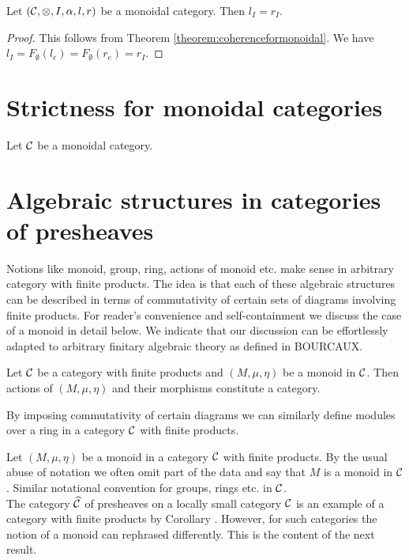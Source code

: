 \begin{corollary}\label{corollary:unitsareequalonunit}
Let $({\mathcal C},\otimes, I,\alpha, l, r)$ be a monoidal category. Then $l_I = r_I$.
\end{corollary}
\begin{proof}
This follows from Theorem \ref{theorem:coherenceformonoidal}. We have $l_I=F_\emptyset(l_e) = F_\emptyset(r_e)=r_I$.  
\end{proof}

\section{Strictness for monoidal categories}
\noindent
Let ${\mathcal C}$ be a monoidal category. 























\section{Algebraic structures in categories of presheaves}
\noindent
Notions like  monoid, group, ring, actions of monoid etc. make sense in arbitrary category with finite products. The idea is that each of these algebraic structures can be described in terms of commutativity of certain sets of diagrams involving finite products. For reader's convenience and self-containment we discuss the case of a monoid in detail below. We indicate that our discussion can be effortlessly adapted to arbitrary finitary algebraic theory as defined in BOURCAUX.



\begin{remark}
Let ${\mathcal C}$ be a category with finite products and $(M,\mu,\eta)$ be a monoid in ${\mathcal C}$. Then actions of $(M,\mu,\eta)$ and their morphisms constitute a category. 
\end{remark}

\begin{remark}
By imposing commutativity of certain diagrams we can similarly define modules over a ring in a category ${\mathcal C}$ with finite products.
\end{remark}
\noindent
Let $(M,\mu,\eta)$ be a monoid in a category ${\mathcal C}$ with finite products. By the usual abuse of notation we often omit part of the data and say that $M$ is a monoid in ${\mathcal C}$. Similar notational convention for groups, rings etc. in ${\mathcal C}$.\\
The category $\widehat{{\mathcal C}}$ of presheaves on a locally small category ${\mathcal C}$ is an example of a category with finite products by Corollary . However, for such categories the notion of a monoid can rephrased differently. This is the content of the next result.

